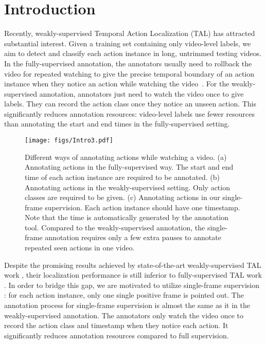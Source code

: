 \documentclass[runningheads]{llncs}
\begin{document}
	
	\section{Introduction}
	
	
	Recently, weakly-supervised Temporal Action Localization (TAL) has attracted substantial interest.  Given a training set containing only video-level labels, we aim to detect and classify each action instance in long, untrimmed testing videos.
	In the fully-supervised annotation, the annotators usually need to rollback the video for repeated watching to give the precise temporal boundary of an action instance when they notice an action while watching the video~\cite{zhao2019hacs}. For the weakly-supervised annotation, annotators just need to watch the video once to give labels. They can record the action class once they notice an unseen action.
	This significantly reduces annotation resources: video-level labels use fewer resources than annotating the start and end times in the fully-supervised setting.
	
	
	
	\begin{figure}[!t]
		\centering
		\texttt{[image: figs/Intro3.pdf]}
		\caption{Different ways of annotating actions while watching a video. (a) Annotating actions in the fully-supervised way. The start and end time of each action instance are required to be annotated. (b) Annotating actions in the weakly-supervised setting. Only action classes are required to be given. (c) Annotating actions in our single-frame supervision. Each action instance should have one timestamp. Note that the time is automatically generated by the annotation tool. Compared to the weakly-supervised annotation, the single-frame annotation requires only a few extra pauses to annotate repeated seen actions in one video.}
\label{fig:introduction}
	\end{figure}
	
	
	Despite the promising results achieved by state-of-the-art weakly-supervised TAL work \cite{nguyen2018weakly,paul2018w,shou2018autoloc}, their localization performance is still inferior to fully-supervised TAL work \cite{chao2018rethinking,lin2018bsn,Shou_2017_CVPR}.
	In order to bridge this gap, we are motivated to utilize single-frame supervision \cite{moltisanti2019action}: for each action instance, only one single positive frame is pointed out.
	The annotation process for single-frame supervision is almost the same as it in the weakly-supervised annotation. 
	The annotators only watch the video once to record the action class and timestamp when they notice each action. It significantly reduces annotation resources compared to full supervision.
	
\end{document}
